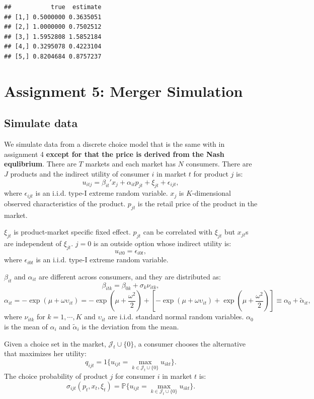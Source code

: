 \documentclass[
]{book}
\begin{document}
\begin{verbatim}
##           true  estimate
## [1,] 0.5000000 0.3635051
## [2,] 1.0000000 0.7502512
## [3,] 1.5952808 1.5852184
## [4,] 0.3295078 0.4223104
## [5,] 0.8204684 0.8757237
\end{verbatim}

\hypertarget{assignment5}{%
\chapter{Assignment 5: Merger Simulation}\label{assignment5}}

\hypertarget{simulate-data-4}{%
\section{Simulate data}\label{simulate-data-4}}

We simulate data from a discrete choice model that is the same with in assignment 4 \textbf{except for that the price is derived from the Nash equlibrium}. There are \(T\) markets and each market has \(N\) consumers. There are \(J\) products and the indirect utility of consumer \(i\) in market \(t\) for product \(j\) is:
\[
u_{itj} = \beta_{it}' x_j + \alpha_{it} p_{jt} + \xi_{jt} + \epsilon_{ijt},
\]
where \(\epsilon_{ijt}\) is an i.i.d. type-I extreme random variable. \(x_j\) is \(K\)-dimensional observed characteristics of the product. \(p_{jt}\) is the retail price of the product in the market.

\(\xi_{jt}\) is product-market specific fixed effect. \(p_{jt}\) can be correlated with \(\xi_{jt}\) but \(x_{jt}\)s are independent of \(\xi_{jt}\). \(j = 0\) is an outside option whose indirect utility is:
\[
u_{it0} = \epsilon_{i0t},
\]
where \(\epsilon_{i0t}\) is an i.i.d. type-I extreme random variable.

\(\beta_{it}\) and \(\alpha_{it}\) are different across consumers, and they are distributed as:
\[
\beta_{itk} = \beta_{0k} + \sigma_k \nu_{itk},
\]
\[
\alpha_{it} = - \exp(\mu + \omega \upsilon_{it}) = - \exp(\mu + \frac{\omega^2}{2}) + [- \exp(\mu + \omega \upsilon_{it}) + \exp(\mu + \frac{\omega^2}{2})] \equiv \alpha_0 + \tilde{\alpha}_{it},
\]
where \(\nu_{itk}\) for \(k = 1, \cdots, K\) and \(\upsilon_{it}\) are i.i.d. standard normal random variables. \(\alpha_0\) is the mean of \(\alpha_i\) and \(\tilde{\alpha}_i\) is the deviation from the mean.

Given a choice set in the market, \(\mathcal{J}_t \cup \{0\}\), a consumer chooses the alternative that maximizes her utility:
\[
q_{ijt} = 1\{u_{ijt} = \max_{k \in \mathcal{J}_t \cup \{0\}} u_{ikt}\}.
\]
The choice probability of product \(j\) for consumer \(i\) in market \(t\) is:
\[
\sigma_{ijt}(p_t, x_t, \xi_t) = \mathbb{P}\{u_{ijt} = \max_{k \in \mathcal{J}_t \cup \{0\}} u_{ikt}\}.
\]
\end{document}
